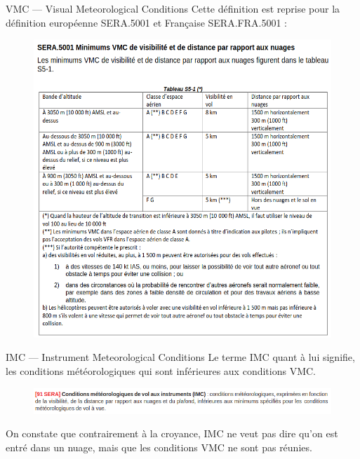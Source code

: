 \documentclass{beamer}
\begin{document}
\begin{frame}{VMC — Visual Meteorological Conditions}
  Cette définition est reprise pour la définition européenne SERA.5001 et Française SERA.FRA.5001 :

  \pause
  \begin{figure}
    \centering
    \includegraphics[scale=1]{images/sera.5001.png}
  \end{figure}
\end{frame}

\begin{frame}{IMC — Instrument Meteorological Conditions}
  Le terme IMC quant à lui signifie, les conditions météorologiques qui sont inférieures aux conditions VMC.

  \pause
  \begin{figure}
    \centering
    \includegraphics[scale=1.8]{images/sera.imc.png}
  \end{figure}

  \pause

  On constate que contrairement à la croyance, IMC ne veut pas dire
  qu'on est entré dans un nuage, mais que les conditions VMC ne sont
  pas réunies.
\end{frame}
\end{document}
